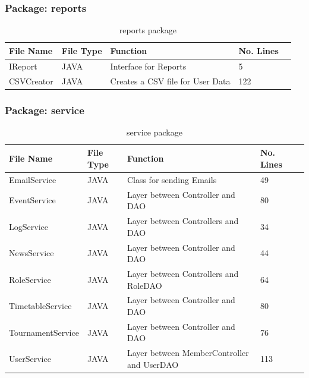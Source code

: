 \subsubsection{Package: reports}
\begin{table}[H]
\begin{center}
     \begin{tabular}{| l | l | l| l |p{1cm} |}
    \hline
    File Name & File Type & Function & No. Lines\\ \hline
    IReport & JAVA & Interface for Reports & 5\\ \hline
	CSVCreator & JAVA & Creates a CSV file for User Data & 122\\ \hline
    \end{tabular}
\end{center}
\caption{reports package}
\end{table}

\subsubsection{Package: service}
\begin{table}[H]
\begin{center}
      \begin{tabular}{| l | l | l| l |p{1cm} |}
    \hline
    File Name & File Type & Function & No. Lines\\ \hline
	EmailService & JAVA & Class for sending Emails & 49\\ \hline
    EventService & JAVA & Layer between Controller and DAO & 80\\ \hline
    LogService & JAVA & Layer between Controllers and DAO & 34\\ \hline
	NewsService & JAVA & Layer between Controller and DAO & 44\\ \hline
	RoleService & JAVA & Layer between Controllers and RoleDAO & 64\\ \hline
	TimetableService & JAVA & Layer between Controller and DAO & 80\\ \hline
	TournamentService & JAVA & Layer between Controller and DAO & 76\\ \hline
	UserService & JAVA & Layer between MemberController and UserDAO & 113\\ \hline
    \end{tabular}
\end{center}
\caption{service package}
\end{table}

